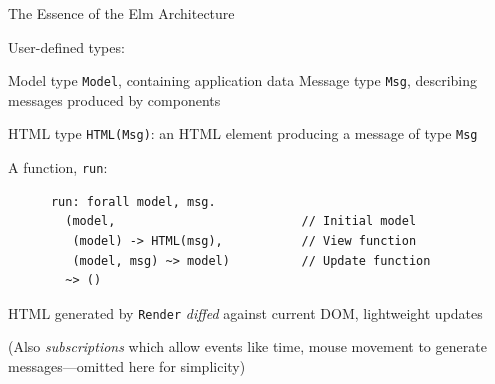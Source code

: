 \documentclass[11.5pt, aspectratio=169]{beamer}
\begin{document}
\begin{frame}[fragile]{The Essence of the Elm Architecture}

  \begin{fullpageitemize}
  \item<1-> User-defined types:
    \begin{itemize}
      \itemR Model type \verb+Model+, containing application data
      \itemR Message type \verb+Msg+, describing messages produced by components
    \end{itemize}
    \vspace{0em}

  \item<2-> HTML type \verb+HTML(Msg)+: an HTML element producing a message of
    type \verb+Msg+

  \item<3-> A function, \verb+run+:
    \begin{verbatim}
      run: forall model, msg.
        (model,                          // Initial model
         (model) -> HTML(msg),           // View function
         (model, msg) ~> model)          // Update function
        ~> ()
    \end{verbatim}

    \vspace{0em}

  \item<4-> HTML generated by \verb+Render+ \emph{diffed} against current DOM, lightweight updates
  \item<5-> (Also \emph{subscriptions} which allow events like time, mouse movement
    to generate messages---omitted here for simplicity)
  \end{fullpageitemize}
\end{frame}
\end{document}

